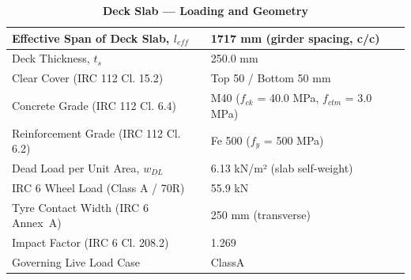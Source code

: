 \documentclass[12pt,a4paper]{report}
\numberwithin{table}{chapter}
\numberwithin{figure}{chapter}
\begin{document}
\vspace{1em}
\begin{longtable}{|L{5.5cm}|p{10.0cm}|}
\caption{\textbf{Deck Slab --- Loading and Geometry}}
\hline
\textnormal{Effective Span of Deck Slab, $l_{eff}$} & 1717 mm (girder spacing, c/c) \\[6pt]
\hline
\textnormal{Deck Thickness, $t_s$} & 250.0 mm \\[6pt]
\hline
\textnormal{Clear Cover (IRC 112 Cl. 15.2)} & Top 50 / Bottom 50 mm \\[6pt]
\hline
\textnormal{Concrete Grade (IRC 112 Cl. 6.4)} & M40 ($f_{ck}$ = 40.0 MPa, $f_{ctm}$ = 3.0 MPa) \\[6pt]
\hline
\textnormal{Reinforcement Grade (IRC 112 Cl. 6.2)} & Fe 500 ($f_y$ = 500 MPa) \\[6pt]
\hline
\textnormal{Dead Load per Unit Area, $w_{DL}$} & 6.13 kN/m² (slab self-weight) \\[6pt]
\hline
\textnormal{IRC 6 Wheel Load (Class A / 70R)} & 55.9 kN \\[6pt]
\hline
\textnormal{Tyre Contact Width (IRC 6 Annex~A)} & 250 mm (transverse) \\[6pt]
\hline
\textnormal{Impact Factor (IRC 6 Cl. 208.2)} & 1.269 \\[6pt]
\hline
\textnormal{Governing Live Load Case} & ClassA \\[6pt]
\hline
\end{longtable}
\end{document}
